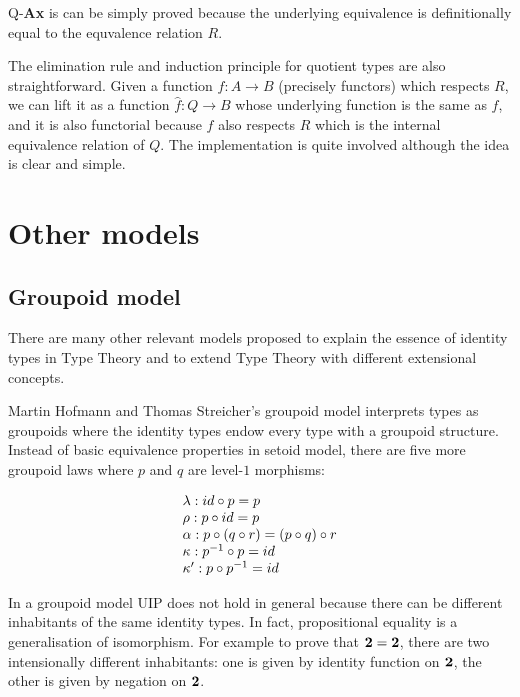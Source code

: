 Q-\textbf{Ax} is can be simply proved because the underlying equivalence is definitionally equal to the equvalence relation $R$.

The elimination rule and induction principle for quotient types are also straightforward. Given a function $f : A \to B$ (precisely functors) which respects $R$, we can lift it as a function  $\hat{f} : Q \to B$ whose underlying function is the same as $f$, and it is also functorial because $f$ also respects $R$ which is the internal equivalence relation of $Q$.
The implementation is quite involved although the idea is clear and simple.


\section{Other models}


\subsection{Groupoid model}

There are many other relevant models proposed to explain the essence of identity types in Type Theory and to extend Type Theory with different extensional concepts. 

Martin Hofmann and Thomas Streicher's \cite{MR1686862} groupoid model interprets types as groupoids where the identity types endow every type with a groupoid structure. Instead of basic equivalence properties in setoid model, there are five more groupoid laws where $p$ and $q$ are level-$1$ morphisms:

\begin{equation*}
\begin{array}[b]{l}
\lambda : id \circ p = p \\
\rho : p \circ id = p \\
\alpha : p \circ (q \circ r) = (p \circ q) \circ r \\
\kappa : p^{-1}\circ p = id \\
\kappa' : p \circ p^{-1} = id
 \end{array}
\end{equation*}

In a groupoid model UIP does not hold in general because there can be different inhabitants of the same identity types. In fact, propositional equality is a generalisation of isomorphism. For example to prove that $\mathbf{2} = \mathbf{2}$, there are two intensionally different inhabitants: one is given by identity function on $\mathbf{2}$, the other is given by negation on $\mathbf{2}$.

